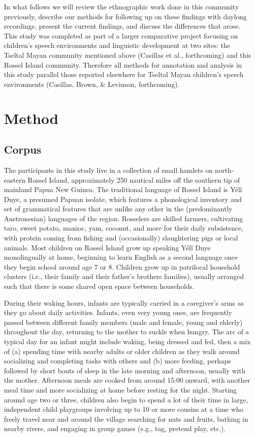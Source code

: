 \documentclass[,man,floatsintext]{apa6}
\begin{document}
In what follows we will review the ethnographic work done in this
community previously, describe our methods for following up on these
findings with daylong recordings, present the current findings, and
discuss the differences that arose. This study was completed as part of
a larger comparative project focusing on children's speech environments
and linguistic development at two sites: the Tseltal Mayan community
mentioned above (Casillas et al., forthcoming) and this Rossel Island
community. Therefore all methods for annotation and analysis in this
study parallel those reported elsewhere for Tseltal Mayan children's
speech environments (Casillas, Brown, \& Levinson, forthcoming).

\section{Method}\label{methods}

\subsection{Corpus}\label{methods-dataset}

The participants in this study live in a collection of small hamlets on
north-eastern Rossel Island, approximately 250 nautical miles off the
southern tip of mainland Papua New Guinea. The traditional language of
Rossel Island is Yélî Dnye, a presumed Papuan isolate, which features a
phonological inventory and set of grammatical features that are unlike
any other in the (predominantly Austronesian) languages of the region.
Rosselers are skilled farmers, cultivating taro, sweet potato, manioc,
yam, coconut, and more for their daily subsistence, with protein coming
from fishing and (occasionally) slaughtering pigs or local animals. Most
children on Rossel Island grow up speaking Yélî Dnye monolingually at
home, beginning to learn English as a second language once they begin
school around age 7 or 8. Children grow up in patrilocal household
clusters (i.e., their family and their father's brothers families),
usually arranged such that there is some shared open space between
households.

During their waking hours, infants are typically carried in a
caregiver's arms as they go about daily activities. Infants, even very
young ones, are frequently passed between different family members (male
and female, young and elderly) throughout the day, returning to the
mother to suckle when hungry. The arc of a typical day for an infant
might include waking, being dressed and fed, then a mix of (a) spending
time with nearby adults or older children as they walk around
socializing and completing tasks with others and (b) more feeding,
perhaps followed by short bouts of sleep in the late morning and
afternoon, usually with the mother. Afternoon meals are cooked from
around 15:00 onward, with another meal time and more socializing at home
before resting for the night. Starting around age two or three, children
also begin to spend a lot of their time in large, independent child
playgroups involving up to 10 or more cousins at a time who freely
travel near and around the village searching for nuts and fruits,
bathing in nearby rivers, and engaging in group games (e.g., tag,
pretend play, etc.).
\end{document}
